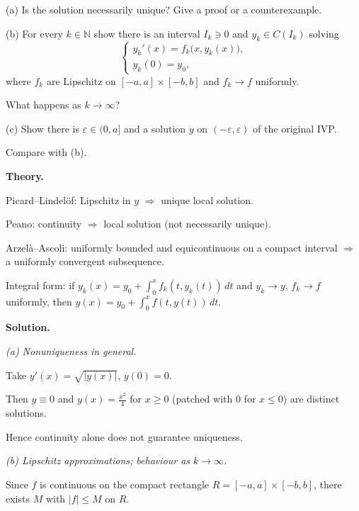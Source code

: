 \documentclass[12pt,a4paper]{article}
\begin{document}
\medskip

(a)\; Is the solution necessarily unique? Give a proof or a counterexample.

\medskip

(b)\; For every $k\in\mathbb N$ show there is an interval $I_k\ni0$ and $y_k\in C(I_k)$ solving
\[
\begin{cases}
	y_k'(x)=f_k\big(x,y_k(x)\big),\\[2pt]
	y_k(0)=y_0,
\end{cases}
\]
where $f_k$ are Lipschitz on $[-a,a]\times[-b,b]$ and $f_k\to f$ uniformly.

\medskip

What happens as $k\to\infty$?

\medskip

(c)\; Show there is $\varepsilon\in(0,a]$ and a solution $y$ on $(-\varepsilon,\varepsilon)$ of the original IVP.

\medskip

Compare with (b).

\medskip

\textbf{Theory.}

Picard--Lindel\"of: Lipschitz in $y$ $\Rightarrow$ unique local solution.

\medskip

Peano: continuity $\Rightarrow$ local solution (not necessarily unique).

\medskip

Arzel\`a--Ascoli: uniformly bounded and equicontinuous on a compact interval $\Rightarrow$ a uniformly convergent subsequence.

\medskip

Integral form: if $y_k(x)=y_0+\int_0^x f_k(t,y_k(t))\,dt$ and $y_k\to y$, $f_k\to f$ uniformly, then $y(x)=y_0+\int_0^x f(t,y(t))\,dt$.

\medskip

\textbf{Solution.}

\emph{(a) Nonuniqueness in general.}

Take $y'(x)=\sqrt{|y(x)|}$, $y(0)=0$.

Then $y\equiv0$ and $y(x)=\tfrac{x^2}{4}$ for $x\ge0$ (patched with $0$ for $x\le0$)
are distinct solutions.

Hence continuity alone does not guarantee uniqueness.

\medskip

\emph{(b) Lipschitz approximations; behaviour as $k\to\infty$.}

Since $f$ is continuous on the compact rectangle $R=[-a,a]\times[-b,b]$,
there exists $M$ with $|f|\le M$ on $R$.
\end{document}
